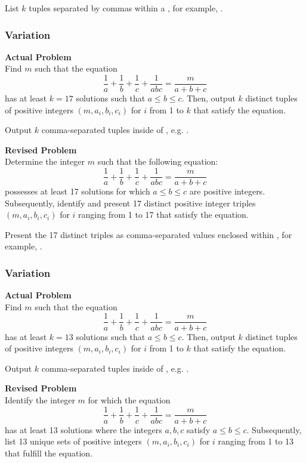 List \( k \) tuples separated by commas within a \boxed{}, for example, .

\subsubsection{Variation}
\textbf{Actual Problem}\\
Find $m$ such that the equation
$$
\frac{1}{a} + \frac{1}{b} + \frac{1}{c} + \frac{1}{abc} = \frac{m}{a + b + c}
$$
has at least $k = 17$ solutions such that $a \leq b \leq c$.
Then, output $k$ distinct tuples of positive integers $(m, a_i, b_i, c_i)$ for $i$ from 1 to $k$ that satisfy the equation.


Output $k$ comma-separated tuples inside of \boxed{}, e.g. .

\textbf{Revised Problem}\\
Determine the integer \( m \) such that the following equation:
$$
\frac{1}{a} + \frac{1}{b} + \frac{1}{c} + \frac{1}{abc} = \frac{m}{a + b + c}
$$
possesses at least 17 solutions for which \( a \leq b \leq c \) are positive integers. Subsequently, identify and present 17 distinct positive integer triples \((m, a_i, b_i, c_i)\) for \( i \) ranging from 1 to 17 that satisfy the equation.

Present the 17 distinct triples as comma-separated values enclosed within \boxed{}, for example, .

\subsubsection{Variation}
\textbf{Actual Problem}\\
Find $m$ such that the equation
$$
\frac{1}{a} + \frac{1}{b} + \frac{1}{c} + \frac{1}{abc} = \frac{m}{a + b + c}
$$
has at least $k = 13$ solutions such that $a \leq b \leq c$.
Then, output $k$ distinct tuples of positive integers $(m, a_i, b_i, c_i)$ for $i$ from 1 to $k$ that satisfy the equation.


Output $k$ comma-separated tuples inside of \boxed{}, e.g. .

\textbf{Revised Problem}\\
Identify the integer \( m \) for which the equation
$$
\frac{1}{a} + \frac{1}{b} + \frac{1}{c} + \frac{1}{abc} = \frac{m}{a + b + c}
$$
has at least 13 solutions where the integers \( a, b, c \) satisfy \( a \leq b \leq c \). Subsequently, list 13 unique sets of positive integers \((m, a_i, b_i, c_i)\) for \( i \) ranging from 1 to 13 that fulfill the equation.

